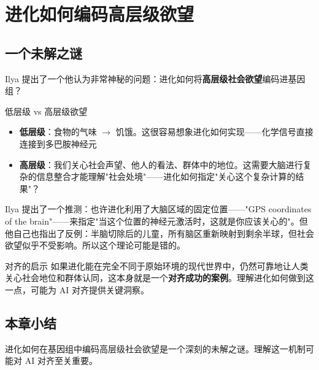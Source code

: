 \section{进化如何编码高层级欲望}

\subsection{一个未解之谜}

Ilya 提出了一个他认为非常神秘的问题：进化如何将\textbf{高层级社会欲望}编码进基因组？

\begin{knowledgebox}{低层级 vs 高层级欲望}
\begin{itemize}
    \item \textbf{低层级}：食物的气味 $\rightarrow$ 饥饿。这很容易想象进化如何实现——化学信号直接连接到多巴胺神经元
    \item \textbf{高层级}：我们关心社会声望、他人的看法、群体中的地位。这需要大脑进行复杂的信息整合才能理解"社会处境"——进化如何指定"关心这个复杂计算的结果"？
\end{itemize}
\end{knowledgebox}

Ilya 提出了一个推测：也许进化利用了大脑区域的固定位置——"GPS coordinates of the brain"——来指定"当这个位置的神经元激活时，这就是你应该关心的"。但他自己也指出了反例：半脑切除后的儿童，所有脑区重新映射到剩余半球，但社会欲望似乎不受影响。所以这个理论可能是错的。

\begin{importantbox}{对齐的启示}
如果进化能在完全不同于原始环境的现代世界中，仍然可靠地让人类关心社会地位和群体认同，这本身就是一个\textbf{对齐成功的案例}。理解进化如何做到这一点，可能为 AI 对齐提供关键洞察。
\end{importantbox}

\subsection{本章小结}

进化如何在基因组中编码高层级社会欲望是一个深刻的未解之谜。理解这一机制可能对 AI 对齐至关重要。


